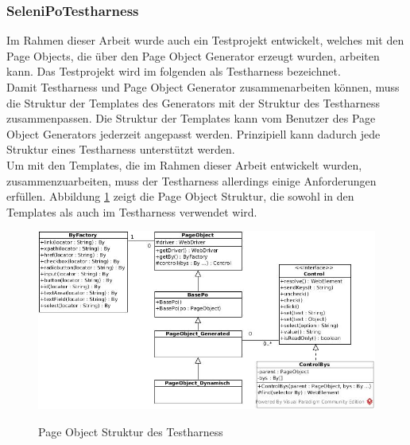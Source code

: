 \subsubsection{SeleniPoTestharness}
\label{sec:selenipotestharness}

Im Rahmen dieser Arbeit wurde auch ein Testprojekt entwickelt, welches mit den Page Objects, die über den Page Object Generator erzeugt wurden, arbeiten kann.
Das Testprojekt wird im folgenden als Testharness bezeichnet.\\
Damit Testharness und Page Object Generator zusammenarbeiten können, muss die Struktur der Templates des Generators mit der Struktur des Testharness zusammenpassen.
Die Struktur der Templates kann vom Benutzer des Page Object Generators jederzeit angepasst werden. Prinzipiell kann dadurch jede Struktur eines Testharness unterstützt werden.\\
Um mit den Templates, die im Rahmen dieser Arbeit entwickelt wurden, zusammenzuarbeiten, muss der Testharness allerdings einige Anforderungen erfüllen.
Abbildung \ref{fig:strukturTestharness} zeigt die Page Object Struktur, die sowohl in den Templates als auch im Testharness verwendet wird.\\
\begin{figure}[htb]
  \centering  
  \includegraphics[scale=0.49]{img/strukturTestharness.jpg}\\
  \caption{Page Object Struktur des Testharness}
  \label{fig:strukturTestharness}
\end{figure}

